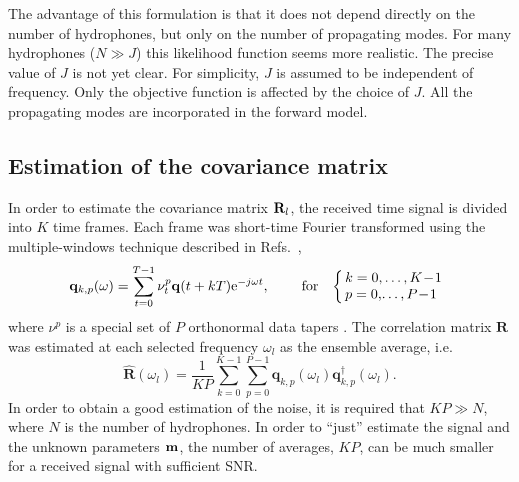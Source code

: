 \documentclass{saclantc}
\begin{document}
The advantage of this formulation is that it does not depend directly
on the number of hydrophones, but only on the number of propagating modes. 
For many hydrophones ($N\gg J$) this likelihood function seems more realistic. 
The precise value of $J$ is not yet clear. For simplicity,
$J$ is assumed to be independent of frequency.
% 
Only the objective function is affected by the choice of $J$. All the
propagating modes are incorporated in the forward model.


\subsection{Estimation of the covariance matrix}
\label{se:cov}
In order to estimate the covariance matrix ${\bf R}_l$, the received
time signal is divided into $K$ time frames. 
Each frame was short-time Fourier transformed using the multiple-windows
technique described in Refs.~\cite{thompson:icassp94,meckl:icassp95},
\begin{equation}
 \label{eq:multiple-win-ft}
 {\mathbf{q}}_{k,p}(\omega) = \sum\limits_{t=0}^{T-1}
      \nu^{p}_t {\mathbf{q}}(t+kT) {\rm e}^{-j\omega t}, \;
 \quad\quad\mbox{for}\quad \!\left\{\begin{array}{l}
       \! \!   k=0,\ldots,K\! - \! 1 \\
       \! \!   p=0, \! \ldots,P\! - \! 1 \\ \end{array} \right. 
\end{equation}
where $\nu^{p}$ is a special set of $P$ orthonormal 
data tapers \cite{thompson:icassp94,meckl:icassp95}.
The correlation matrix $\mathbf{R}$ was estimated at each selected frequency
$\omega_l$ as the ensemble average, i.e.
\begin{equation}
\hat{\mathbf{R}} (\omega_l)=
\frac{1}{KP} \sum_{k=0}^{K-1} \sum_{p=0}^{P-1}
     {\mathbf{q}}_{k,p}(\omega_l) {\mathbf{q}}^\dagger_{k,p}(\omega_l).
\label{eq:R-ensemble-avg}
\end{equation}
In order to obtain a good estimation of the noise, it is required that 
$KP\gg N$, where $N$ is the number of hydrophones. In order to
``just'' estimate the signal and the unknown parameters $\bf m$, the
number of averages, $KP$, can be much smaller for a received signal with
sufficient SNR. 




 \label{se:reg}
\end{document}
